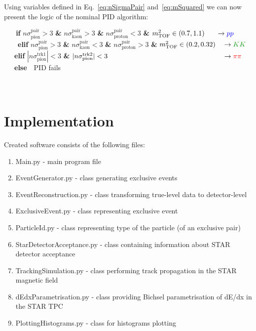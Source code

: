 \documentclass[a4paper,11pt]{article}
\begin{document}
Using variables defined in Eq.~\ref{eq:nSigmaPair} and~\ref{eq:mSquared} we can now present the logic of the nominal PID algorithm:
\begin{center}
\textbf{~~~if} $n\sigma_{\text{pion}}^{\text{pair}}>3$ \textbf{\&} $n\sigma_{\text{kaon}}^{\text{pair}}>3$ \textbf{\&} $n\sigma_{\text{proton}}^{\text{pair}}<3$ \textbf{\&} $m^{2}_{\text{TOF}}\in(0.7,1.1)~~~~~\rightarrow \textcolor{blue}{pp}$\\
~~~~\textbf{elif} $n\sigma_{\text{pion}}^{\text{pair}}>3$ \textbf{\&} $n\sigma_{\text{kaon}}^{\text{pair}}<3$ \textbf{\&} $n\sigma_{\text{proton}}^{\text{pair}}>3$ \textbf{\&} $m^{2}_{\text{TOF}}\in(0.2,0.32)~~~\rightarrow \textcolor{dgreen}{KK}$\\
~~~\textbf{elif} $|n\sigma_{\text{pion}}^{\text{trk1}}|<3$ \textbf{\&} $|n\sigma_{\text{pion}}^{\text{trk2}}|<3 ~~~~~~~~~~~~~~~~~~~~~~~~~~~~~~~~~~~~~~~~~~~~~~~~~~ \rightarrow \textcolor{red}{\pi\pi}~$\\
~~~\textbf{else}~~\textrm{PID fails} ~~~~~~~~~~~~~~~~~~~~~~~~~~~~~~~~~~~~~~~~~~~~~~~~~~~~~~~~~~~~~~~~~~~~~~~~~~~~~~~~~~ 
\end{center}



\section{Implementation}

Created software consists of the following files:\vspace*{-7pt}
\begin{enumerate}
\item Main.py - main program file\vspace*{-7pt}
\item EventGenerator.py - class generating exclusive events\vspace*{-7pt}
\item EventReconstruction.py - class transforming true-level data to detector-level\vspace*{-7pt}
\item ExclusiveEvent.py - class representing exclusive event\vspace*{-7pt}
\item ParticleId.py - class representing type of the particle (of an exclusive pair)\vspace*{-7pt}
\item StarDetectorAcceptance.py - class containing information about STAR detector acceptance\vspace*{-7pt}
\item TrackingSimulation.py - class performing track propagation in the STAR magnetic field\vspace*{-7pt}
\item dEdxParametrisation.py - class providing Bichsel parametrisation of dE/dx in the STAR TPC\vspace*{-7pt}
\item PlottingHistograms.py - class for histograms plotting
\end{enumerate}
\end{document}
